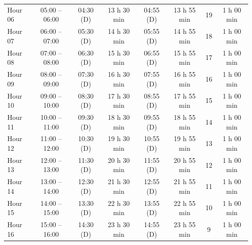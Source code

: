 \begin{appendix}
\begin{table}[htbp]
{\begin{tabular}{l c c c c c c c}
            Hour 06          & 05:00 -- 06:00          & 04:30 (D)             & 13 h 30 min               & 04:55 (D)             & 13 h 55 min               & 19                        & 1 h 00 min                \\
            Hour 07          & 06:00 -- 07:00          & 05:30 (D)             & 14 h 30 min               & 05:55 (D)             & 14 h 55 min               & 18                        & 1 h 00 min                \\
            Hour 08          & 07:00 -- 08:00          & 06:30 (D)             & 15 h 30 min               & 06:55 (D)             & 15 h 55 min               & 17                        & 1 h 00 min                \\
            Hour 09          & 08:00 -- 09:00          & 07:30 (D)             & 16 h 30 min               & 07:55 (D)             & 16 h 55 min               & 16                        & 1 h 00 min                \\
            Hour 10          & 09:00 -- 10:00          & 08:30 (D)             & 17 h 30 min               & 08:55 (D)             & 17 h 55 min               & 15                        & 1 h 00 min                \\
            Hour 11          & 10:00 -- 11:00          & 09:30 (D)             & 18 h 30 min               & 09:55 (D)             & 18 h 55 min               & 14                        & 1 h 00 min                \\
            Hour 12          & 11:00 -- 12:00          & 10:30 (D)             & 19 h 30 min               & 10:55 (D)             & 19 h 55 min               & 13                        & 1 h 00 min                \\
            Hour 13          & 12:00 -- 13:00          & 11:30 (D)             & 20 h 30 min               & 11:55 (D)             & 20 h 55 min               & 12                        & 1 h 00 min                \\
            Hour 14          & 13:00 -- 14:00          & 12:30 (D)             & 21 h 30 min               & 12:55 (D)             & 21 h 55 min               & 11                        & 1 h 00 min                \\
            Hour 15          & 14:00 -- 15:00          & 13:30 (D)             & 22 h 30 min               & 13:55 (D)             & 22 h 55 min               & 10                        & 1 h 00 min                \\
            Hour 16          & 15:00 -- 16:00          & 14:30 (D)             & 23 h 30 min               & 14:55 (D)             & 23 h 55 min               & 9                         & 1 h 00 min                \\

\end{tabular}}
\end{table}
\end{appendix}
